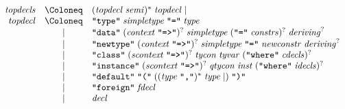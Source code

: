\begin{align*}
  \begin{array}{rcl}
    \mathit{topdecls}
    & \Coloneq & (\mathit{topdecl}\; \mathit{semi})^*\; \mathit{topdecl} \mid \\
    \mathit{topdecl}
    & \Coloneq & \text{\texttt{\textquotedbl type\textquotedbl}}\; \mathit{simpletype}\; \text{\texttt{\textquotedbl =\textquotedbl}}\; \mathit{type} \\
    & \mid & \text{\texttt{\textquotedbl data\textquotedbl}}\; (\mathit{context}\; \text{\texttt{\textquotedbl =>\textquotedbl}})^?\; \mathit{simpletype}\; (\text{\texttt{\textquotedbl =\textquotedbl}}\; \mathit{constrs})^?\; \mathit{deriving}^? \\
    & \mid & \text{\texttt{\textquotedbl newtype\textquotedbl}}\; (\mathit{context}\; \text{\texttt{\textquotedbl =>\textquotedbl}})^?\; \mathit{simpletype}\; \text{\texttt{\textquotedbl =\textquotedbl}}\; \mathit{newconstr}\; \mathit{deriving}^? \\
    & \mid & \text{\texttt{\textquotedbl class\textquotedbl}}\; (\mathit{scontext}\; \text{\texttt{\textquotedbl =>\textquotedbl}})^?\; \mathit{tycon}\; \mathit{tyvar}\; (\text{\texttt{\textquotedbl where\textquotedbl}}\; \mathit{cdecls})^? \\
    & \mid & \text{\texttt{\textquotedbl instance\textquotedbl}}\; (\mathit{scontext}\; \text{\texttt{\textquotedbl =>\textquotedbl}})^?\; \mathit{qtycon}\; \mathit{inst}\; (\text{\texttt{\textquotedbl where\textquotedbl}}\; \mathit{idecls})^? \\
    & \mid & \text{\texttt{\textquotedbl default\textquotedbl}}\; \text{\texttt{\textquotedbl(\textquotedbl}}\; ((\mathit{type}\; \text{\texttt{\textquotedbl,\textquotedbl}})^*\; \mathit{type} \mid )\; \text{\texttt{\textquotedbl)\textquotedbl}} \\
    & \mid & \text{\texttt{\textquotedbl foreign\textquotedbl}}\; \mathit{fdecl} \\
    & \mid & \mathit{decl}
  \end{array}
\end{align*}

